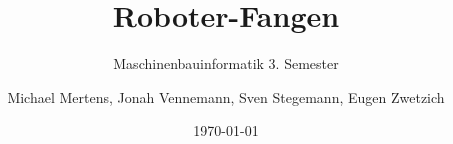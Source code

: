 \documentclass[titlepage=true,11pt,a4paper]{scrartcl}
\begin{document}
	\vfill
	\subject{Dokumentation}
	\title{Roboter-Fangen}
	\subtitle{Maschinenbauinformatik 3. Semester}
	\author{Michael Mertens, Jonah Vennemann, Sven Stegemann, Eugen Zwetzich}
	\date{\today}
	\maketitle
	\newpage
	\setcounter{page}{1}
	\tableofcontents
	\newpage
	
		
	
	
\end{document}
